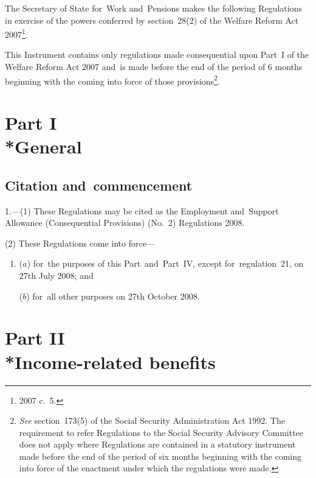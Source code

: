 \documentclass[12pt,a4paper]{article}
\title{\regstitle}
\author{S.I.\ 2008 No.\ 1554}
\date{Made
12th June 2008\\
Laid before Parliament
19th June 2008\\
Coming into~force
in accordance with regulation~1
}
\begin{document}
\maketitle

\noindent
The Secretary of State for~Work and~Pensions makes the following Regulations in exercise of the powers conferred by section~28(2) of the Welfare Reform Act 2007\footnote{2007 c.~5.}.

This Instrument contains only regulations made consequential upon Part~I of the Welfare Reform Act 2007 and~is made before the end of the period of 6 months beginning with the coming into force of those provisions\footnote{\emph{See} section~173(5) of the Social Security Administration Act 1992. The requirement to refer Regulations to the Social Security Advisory Committee does not apply where Regulations are contained in a statutory instrument made before the end of the period of six months beginning with the coming into force of the enactment under which the regulations were made.}. 

{\sloppy

\tableofcontents

}

\bigskip

\setcounter{secnumdepth}{-2}

\section[Part I --- General]{Part I\\*General}

\renewcommand\parthead{--- Part I}

\subsection[1. Citation and~commencement]{Citation and~commencement}

1.---(1)  These Regulations may be cited as the Employment and~Support Allowance (Consequential Provisions) (No.~2) Regulations 2008.

(2) These Regulations come into force—
\begin{enumerate}\item[]
($a$) for~the purposes of this Part~and~Part~IV, except for~regulation~21, on 27th July 2008; and

($b$) for~all other purposes on 27th October 2008.
\end{enumerate}

\section[Part II --- Income-related benefits]{Part II\\*Income-related benefits}
\end{document}
